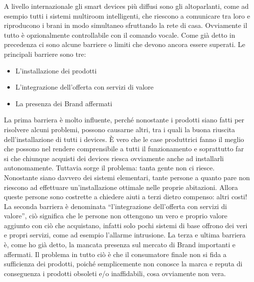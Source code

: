 A livello internazionale gli smart devices più diffusi sono gli altoparlanti, come ad esempio tutti i sistemi multiroom intelligenti, che riescono a comunicare tra loro e riproducono i brani in modo simultaneo sfruttando la rete di casa. Ovviamente il tutto è opzionalmente controllabile con il comando vocale.
Come già detto in precedenza ci sono alcune barriere  o limiti che devono ancora essere superati. Le principali barriere sono tre:
\begin{itemize}
    \item{L’installazione dei prodotti}
    \item{L’integrazione dell’offerta con servizi di valore}
    \item{La presenza dei Brand affermati} 
\end{itemize}
La prima barriera è molto influente, perché nonostante i prodotti siano fatti per risolvere alcuni problemi, possono causarne altri, tra i quali la buona riuscita dell’installazione di tutti i devices. È vero che le case produttrici fanno il meglio che possono nel rendere comprensibile a tutti il funzionamento e soprattutto far si che chiunque acquisti dei devices riesca ovviamente anche ad installarli autonomamente. Tuttavia sorge il problema: tanta gente non ci riesce. 
Nonostante siano davvero dei sistemi elementari, tante persone a quanto pare non riescono ad effettuare un’installazione ottimale nelle proprie abitazioni. Allora queste persone sono costrette a chiedere aiuti a terzi dietro compenso: altri costi!
La seconda barriera è denominata “l’integrazione dell’offerta con servizi di valore”, ciò significa che le persone non ottengono un vero e proprio valore aggiunto con ciò che acquistano, infatti solo pochi sistemi di base offrono dei veri e propri servizi, come ad esempio l’allarme intrusione. 
La terza e ultima barriera è, come ho già detto, la mancata presenza sul mercato di Brand importanti e affermati. Il problema in tutto ciò è che il consumatore finale non si fida a sufficienza dei prodotti, poiché semplicemente non conosce la marca e reputa di conseguenza i prodotti obsoleti e/o inaffidabili, cosa ovviamente non vera.
